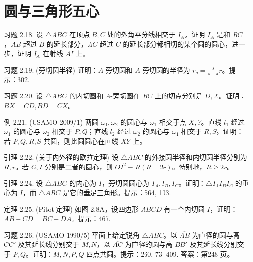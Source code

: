 \part{圆与三角形五心}

\begin{exercise}
    习题 2.18. 设 $\triangle ABC$ 在顶点 $B, C$ 处的外角平分线相交于 $I_A$。证明 $I_A$ 是和 $\overline{BC}$，$AB$ 超过 $B$ 的延长部分，$AC$ 超过 $C$ 的延长部分都相切的某个圆的圆心，进一步，证明 $I_A$ 在射线 $AI$ 上。
\end{exercise}

\begin{exercise}
    习题 2.19. (旁切圆半径) 证明：$A$-旁切圆和 $A$-旁切圆的半径为 $r_a = \frac{s}{s-a}r$。提示：302.
\end{exercise}


\begin{exercise}
    习题 2.20. 设 $\triangle ABC$ 的内切圆和 $A$-旁切圆在 $BC$ 上的切点分别是 $D, X$。证明：$BX = CD, BD = CX$。
\end{exercise}


\begin{exercise}
    例 2.21. (USAMO 2009/1) 两圆 $\omega_1, \omega_2$ 的圆心与 $\omega_1$ 相交于点 $X, Y$。直线 $l_1$ 经过 $\omega_1$ 的圆心与 $\omega_2$ 相交于 $P, Q$；直线 $l_2$ 经过 $\omega_2$ 的圆心与 $\omega_1$ 相交于 $R, S$。证明：若 $P, Q, R, S$ 共圆，则此圆圆心在直线 $XY$ 上。
\end{exercise}


\begin{exercise}
    引理 2.22. (关于内外径的欧拉定理) 设 $\triangle ABC$ 的外接圆半径和内切圆半径分别为 $R, r$。若 $O, I$ 分别是二者的圆心，则 $OI^2 = R(R - 2r)$。特别地，$R \geq 2r$。
\end{exercise}


\begin{exercise}
引理 2.24. 设 $\triangle ABC$ 的内心为 $I$，旁切圆圆心为 $I_A, I_B, I_C$。证明：$\triangle I_A I_B I_C$ 的垂心为 $I$，而 $\triangle ABC$ 是它的垂足三角形。提示：564, 103.
\end{exercise}


\begin{exercise}
    定理 2.25. (Pitot 定理) 如图 2.8A，设四边形 $ABCD$ 有一个内切圆 $I$，证明：$AB + CD = BC + DA$。提示：467.
\end{exercise}


\begin{exercise}
    习题 2.26. (USAMO 1990/5) 平面上给定锐角 $\triangle ABC$。以 $\overline{AB}$ 为直径的圆与高 $\overline{CC'}$ 及其延长线分别交于 $M, N$，以 $\overline{AC}$ 为直径的圆与高 $\overline{BB'}$ 及其延长线分别交于 $P, Q$。证明：$M, N, P, Q$ 四点共圆。提示：260, 73, 409. 答案：第248 页。
\end{exercise}

